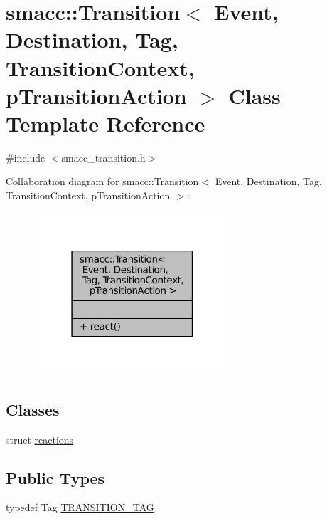 \hypertarget{classsmacc_1_1Transition}{}\section{smacc\+:\+:Transition$<$ Event, Destination, Tag, Transition\+Context, p\+Transition\+Action $>$ Class Template Reference}
\label{classsmacc_1_1Transition}


{\ttfamily \#include $<$smacc\+\_\+transition.\+h$>$}



Collaboration diagram for smacc\+:\+:Transition$<$ Event, Destination, Tag, Transition\+Context, p\+Transition\+Action $>$\+:
\nopagebreak
\begin{figure}[H]
\begin{center}
\leavevmode
\includegraphics[width=207pt]{classsmacc_1_1Transition__coll__graph}
\end{center}
\end{figure}
\subsection*{Classes}
\begin{DoxyCompactItemize}
\item 
struct \hyperlink{structsmacc_1_1Transition_1_1reactions}{reactions}
\end{DoxyCompactItemize}
\subsection*{Public Types}
\begin{DoxyCompactItemize}
\item 
typedef Tag \hyperlink{classsmacc_1_1Transition_a672e883135344c4aea140381dd4d1c1d}{T\+R\+A\+N\+S\+I\+T\+I\+O\+N\+\_\+\+T\+AG}
\end{DoxyCompactItemize}
